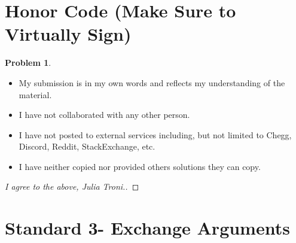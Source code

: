 \documentclass[11pt]{article}
\theoremstyle{definition}
\theoremstyle{definition}
\newtheorem{required}{Problem}
\theoremstyle{definition}
\begin{document}
\section{Honor Code (Make Sure to Virtually Sign)} \label{HonorCode}

\begin{required}
\noindent 
\begin{itemize}
\item My submission is in my own words and reflects my understanding of the material.
\item I have not collaborated with any other person.
\item I have not posted to external services including, but not limited to Chegg, Discord, Reddit, StackExchange, etc.
\item I have neither copied nor provided others solutions they can copy.
\end{itemize}

\end{required}

\begin{proof}[I agree to the above, Julia Troni.]
\end{proof}



\newpage
\section{Standard 3- Exchange Arguments}
\end{document}
